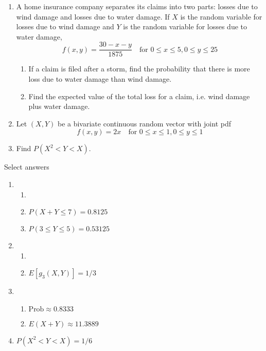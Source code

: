 \documentclass{article}
\begin{document}
\begin{enumerate}
    \item A home insurance company separates its claims into two parts: losses due to wind damage and losses due to water damage. If $X$ is the random variable for losses due to wind damage and $Y$ is the random variable for losses due to water damage,%
    \[f(x,y) = \frac{30 - x - y}{1875} \quad \text{for } 0 \le x \le 5, 0 \le y \le 25\]
    \begin{enumerate}
        \item If a claim is filed after a storm, find the probability that there is more loss due to water damage than wind damage.%
        \item Find the expected value of the total loss for a claim, i.e. wind damage plus water damage.%
    \end{enumerate}\bigskip
    
    \item Let $(X,Y)$ be a bivariate continuous random vector with joint pdf
    \[f(x,y) = 2x \quad \text{for } 0 \le x \le 1, 0 \le y \le 1\]%
    \item[] Find $P(X^2 < Y < X)$.
\end{enumerate}
    
\newpage

Select answers\bigskip
\begin{enumerate}
    \item 
    \begin{enumerate}
        \item 
        \item $P(X + Y \le 7) = 0.8125$
        \item $P(3 \le Y \le 5) = 0.53125$
    \end{enumerate}
    
    \item 
    \begin{enumerate}
        \item 
        \item $E[g_3(X,Y)] = 1/3$
    \end{enumerate}
    
    \item
    \begin{enumerate}
        \item $\text{Prob} \approx 0.8333$
        \item $E(X + Y) \approx 11.3889$
    \end{enumerate}
    
    \item $P(X^2 < Y < X) = 1/6$
    
\end{enumerate}
\end{document}
